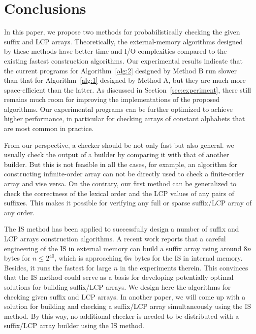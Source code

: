 \documentclass[10pt,journal,compsoc]{IEEEtran}
\begin{document}
\section{Conclusions} \label{sec:conclusion}

In this paper, we propose two methods for probabilistically checking the given suffix and LCP arrays. Theoretically, the external-memory algorithms designed by these methods have better time and I/O complexities compared to the existing fastest construction algorithms. Our experimental results indicate that the current programs for Algorithm~\ref{alg:2} designed by Method B run slower than that for Algorithm~\ref{alg:1} designed by Method A, but they are much more space-efficient than the latter. As discussed in Section~\ref{sec:experiment}, there still remains much room for improving the implementations of the proposed algorithms. Our experimental programs can be further optimized to achieve higher performance, in particular for checking arrays of constant alphabets that are most common in practice. {\color{red}{The optimized programs will run much faster and use at most $n$ integers as the working space in addition to the input arrays.}  }


From our perspective, a checker should be not only fast but also general. %
{\color{red}{In practice,} \color{blue}{not only for program debugging but also for checking results from probabilistic builders}} we usually check the output of a builder by comparing it with that of another builder. But this is not feasible in all the cases, for example, an algorithm for constructing {\color{red}{an}} infinite-order array can not be directly used to check a finite-order array and vise versa. On the contrary, our first method can be generalized to check the correctness of the lexical order and the LCP values of any pairs of suffixes. This makes it possible for verifying any full or sparse suffix/LCP array of any order.

The IS method has been applied to successfully design a number of suffix and LCP arrays construction algorithms. A recent work \cite{Karkkainen2017} reports that a careful engineering of the IS in external memory can build a suffix array using around $8n$ bytes for $n\le 2^{40}$, which is approaching $6n$ bytes for the IS in internal memory. Besides, it runs the fastest for large $n$ in the experiments therein. This convinces that the IS method could serve as a basis for developing potentially optimal solutions for building suffix/LCP arrays. We design here the algorithms for checking given suffix and LCP arrays. In another paper, we will come up with a solution for building and checking a suffix/LCP array simultaneously using the IS method. By this way, no additional checker is needed to be distributed with a suffix/LCP array builder using the IS method.
\end{document}
